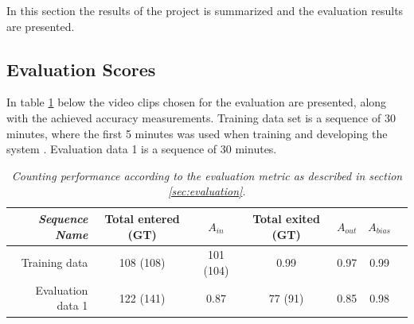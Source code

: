 In this section the results of the project is summarized and the evaluation results are presented.

\subsection{Evaluation Scores}
In table \ref{tab:evaluation_performance} below the video clips chosen for the evaluation are presented, along with the achieved accuracy measurements. Training data set is a sequence of 30 minutes, where the first 5 minutes was used when training and developing the system . Evaluation data 1 is a sequence of 30 minutes. 

\begin{table}[h]
\centering
	\begin{tabular}{r | c | c | c | c | c | c }
		\emph{Sequence Name}		&  Total entered (GT) & \emph{$A_{in}$} & Total exited (GT) & \emph{$A_{out}$} & \emph{$A_{bias}$}\\
		\hline \hline
		Training data			& 108 (108) & 101 (104) & 0.99 & 0.97 & 0.99 \\
		Evaluation data 1		& 122 (141) & 0.87 & 77 (91) & 0.85 & 0.98 \\
		\end{tabular}
	\caption[System performance]{\textit{Counting performance according to the evaluation metric as described in section \ref{sec:evaluation}.}}
	\label{tab:evaluation_performance}
\end{table}

